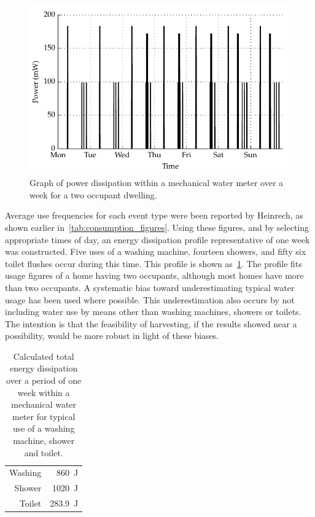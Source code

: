     \begin{figure}
        \centering
        \includegraphics[width=\linewidth]{content/pt1/02-WirelessWaterMeter/graphics/graph_profileEnergy}
        \caption{
          \label{fig:profile_powerDissipation}
          Graph of power dissipation within a mechanical water meter over a week for a two occupant dwelling.
        }
    \end{figure}
    Average use frequencies for each event type were been reported by Heinrech, as shown earlier in~\cref{tab:consumption_figures}.
    Using these figures, and by selecting appropriate times of day, an energy dissipation profile representative of one week was constructed.
    Five uses of a washing machine, fourteen showers, and fifty six toilet flushes occur during this time.
    This profile is shown as~\cref{fig:profile_powerDissipation}.
    The profile fits usage figures of a home having two occupants, although most homes have more than two occupants.
    A systematic bias toward underestimating typical water usage has been used where possible.
    This underestimation also occurs by not including water use by means other than washing machines, showers or toilets.
    The intention is that the feasibility of harvesting, if the results showed near a possibility, would be more robust in light of these biases.
    \begin{table}
      \centering
      \begin{tabular}{r|r}
          Washing & \SI{860}{\joule}\\
          Shower  & \SI{1020}{\joule}\\
          Toilet  & \SI{283.9}{\joule}
      \end{tabular}
      \caption{
          \label{tab:energy_dissipation_total_figures}
          Calculated total energy dissipation over a period of one week within a mechanical water meter for typical use of a washing machine, shower and toilet.
      }
    \end{table}
